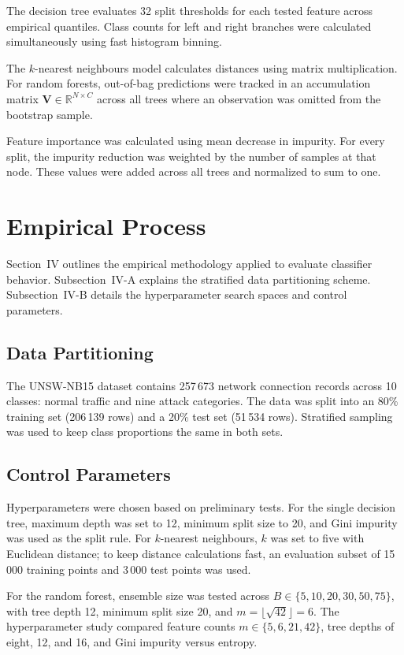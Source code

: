 \documentclass[conference,10pt]{IEEEtran}
\begin{document}
The decision tree evaluates 32 split thresholds for each tested feature across empirical quantiles. Class counts for left and right branches were calculated simultaneously using fast histogram binning.

The $k$-nearest neighbours model calculates distances using matrix multiplication. For random forests, out-of-bag predictions were tracked in an accumulation matrix $\mathbf{V} \in \mathbb{R}^{N \times C}$ across all trees where an observation was omitted from the bootstrap sample.

Feature importance was calculated using mean decrease in impurity. For every split, the impurity reduction was weighted by the number of samples at that node. These values were added across all trees and normalized to sum to one.

\section{Empirical Process}

Section~IV outlines the empirical methodology applied to evaluate classifier behavior. Subsection~IV-A explains the stratified data partitioning scheme. Subsection~IV-B details the hyperparameter search spaces and control parameters.

\subsection{Data Partitioning}

The UNSW-NB15 dataset contains 257\,673 network connection records across 10 classes: normal traffic and nine attack categories. The data was split into an 80\% training set (206\,139 rows) and a 20\% test set (51\,534 rows). Stratified sampling was used to keep class proportions the same in both sets.

\subsection{Control Parameters}

Hyperparameters were chosen based on preliminary tests. For the single decision tree, maximum depth was set to 12, minimum split size to 20, and Gini impurity was used as the split rule. For $k$-nearest neighbours, $k$ was set to five with Euclidean distance; to keep distance calculations fast, an evaluation subset of 15\,000 training points and 3\,000 test points was used.

For the random forest, ensemble size was tested across $B \in \{5, 10, 20, 30, 50, 75\}$, with tree depth 12, minimum split size 20, and $m = \lfloor \sqrt{42} \rfloor = 6$. The hyperparameter study compared feature counts $m \in \{5, 6, 21, 42\}$, tree depths of eight, 12, and 16, and Gini impurity versus entropy.
\end{document}
